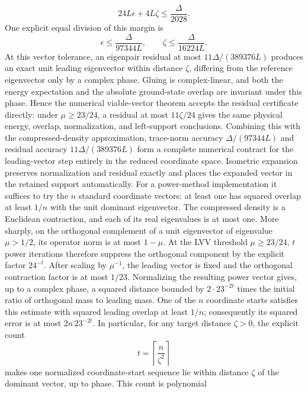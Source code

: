 \begin{lemma}
    \[
        24L\epsilon+4L\zeta\le\frac{\Delta}{2028}.
    \]
    One explicit equal division of this margin is
    \[
        \epsilon\le\frac{\Delta}{97344L},
        \qquad
        \zeta\le\frac{\Delta}{16224L}.
    \]
    At this vector tolerance, an eigenpair residual at most
    \(11\Delta/(389376L)\) produces an exact unit leading eigenvector within
    distance \(\zeta\), differing from the reference eigenvector only by a
    complex phase.
    Gluing is complex-linear, and both the energy expectation and the
    absolute ground-state overlap are invariant under this phase.  Hence the
    numerical viable-vector theorem accepts the residual certificate directly:
    under \(\mu\ge23/24\), a residual at most \(11\zeta/24\) gives the same
    physical energy, overlap, normalization, and left-support conclusions.
    Combining this with the compressed-density approximation, trace-norm
    accuracy \(\Delta/(97344L)\) and residual accuracy
    \(11\Delta/(389376L)\) form a complete numerical contract for the
    leading-vector step entirely in the reduced coordinate space.  Isometric
    expansion preserves normalization and residual exactly and places the
    expanded vector in the retained support automatically.
    For a power-method implementation it suffices to try the \(n\) standard
    coordinate vectors: at least one has squared overlap at least \(1/n\) with
    the unit dominant eigenvector.
    The compressed density is a Euclidean contraction, and each of its real
    eigenvalues is at most one.  More sharply, on the orthogonal complement
    of a unit eigenvector of eigenvalue \(\mu>1/2\), its operator norm is at
    most \(1-\mu\).  At the LVV threshold \(\mu\ge23/24\), \(t\) power
    iterations therefore suppress the orthogonal component by the explicit
    factor \(24^{-t}\).  After scaling by \(\mu^{-1}\), the leading vector is
    fixed and the orthogonal contraction factor is at most \(1/23\).
    Normalizing the resulting power vector gives, up to a complex phase, a
    squared distance bounded by \(2\cdot23^{-2t}\) times the initial ratio of
    orthogonal mass to leading mass.  One of the \(n\) coordinate starts
    satisfies this estimate with squared leading overlap at least \(1/n\);
    consequently its squared error is at most \(2n\,23^{-2t}\).
    In particular, for any target distance \(\zeta>0\), the explicit count
    \[
        t=\left\lceil \frac{n}{\zeta^2}\right\rceil
    \]
    makes one normalized coordinate-start sequence lie within distance
    \(\zeta\) of the dominant vector, up to phase.  This count is polynomial

\end{lemma}
